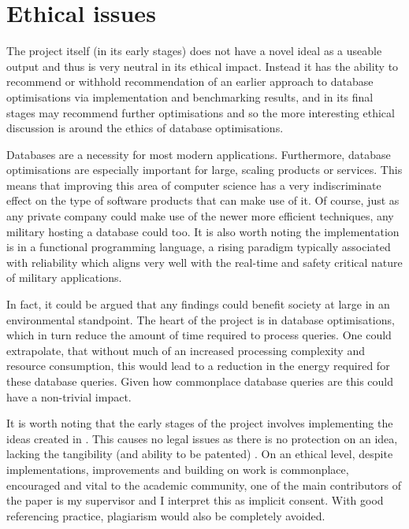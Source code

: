 \chapter{Ethical issues} %
\begin{comment}
What are the wider ethical, legal, professional and societal issues surrounding your project and the accompanying research? You should use the ethics checklist as the basis for this discussion. 
\end{comment}
The project itself (in its early stages) does not have a novel ideal as a useable output and thus is very neutral in its ethical impact. Instead it has the ability to recommend or withhold recommendation of an earlier approach to database optimisations via implementation and benchmarking results, and in its final stages may recommend further optimisations and so the more interesting ethical discussion is around the ethics of database optimisations.

Databases are a necessity for most modern applications. Furthermore, database optimisations are especially important for large, scaling products or services. This means that improving this area of computer science has a very indiscriminate effect on the type of software products that can make use of it. Of course, just as any private company could make use of the newer more efficient techniques, any military hosting a database could too. It is also worth noting the implementation is in a functional programming language, a rising paradigm  typically associated with reliability   which aligns very well with the real-time and safety critical nature of military applications. 

In fact, it could be argued that any findings could benefit society at large in an environmental standpoint. The heart of the project is in database optimisations, which in turn reduce the amount of time required to process queries.  One could extrapolate, that without much of an increased processing complexity and resource consumption, this would lead to a reduction in the energy required for these database queries. Given how commonplace database queries are  this could have a non-trivial impact.

It is worth noting that the early stages of the project involves implementing the ideas created in \cite{RelationalAlgebraByWayOfAdjunctions}. This causes no legal issues as there is no protection on an idea, lacking the tangibility (and ability to be patented) . On an ethical level, despite implementations, improvements and building on work is commonplace, encouraged and vital to the academic community, one of the main contributors of the paper is my supervisor and I interpret this as implicit consent. With good referencing practice, plagiarism would also be completely avoided.

